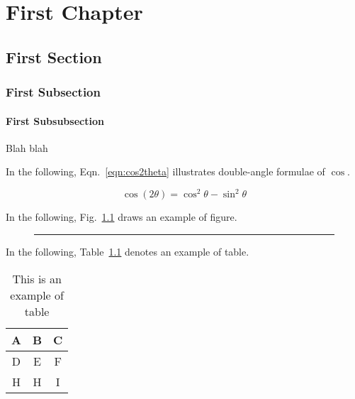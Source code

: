 \documentclass[11pt]{book}
\begin{document}
\pagestyle{plain} %

\tableofcontents
\listoffigures
\listoftables

\clearpage

\chapter{First Chapter}

\setcounter{page}{1}

\section{First Section}

\subsection{First Subsection}

\subsubsection{First Subsubsection}

Blah blah

In the following, Eqn.~\ref{eqn:cos2theta} illustrates double-angle formulae of $\cos$. %

\begin{equation}
\label{eqn:cos2theta}
\cos (2\theta) = \cos^2 \theta - \sin^2 \theta
\end{equation}

\newpage

In the following, Fig.~\ref{fig:dum1} draws an example of figure.
\begin{figure}[ht]
\begin{center}
\rule{0.5\linewidth}{0.35\linewidth}
\caption[Long caption figure]{\blindtext}
\label{fig:dum1}
\end{center}
\end{figure}

In the following, Table~\ref{tbl:table1} denotes an example of table.
\begin{table}[ht]
\caption[Table example]{This is an example of table}
\label{tbl:table1}
\centering
\begin{tabular}{c c c}
\hline
A & B & C \tabularnewline \hline
\rowcolor{lightgray}
D & E & F \tabularnewline
H & H & I \tabularnewline \hline
\end{tabular}
\end{table}
\end{document}
